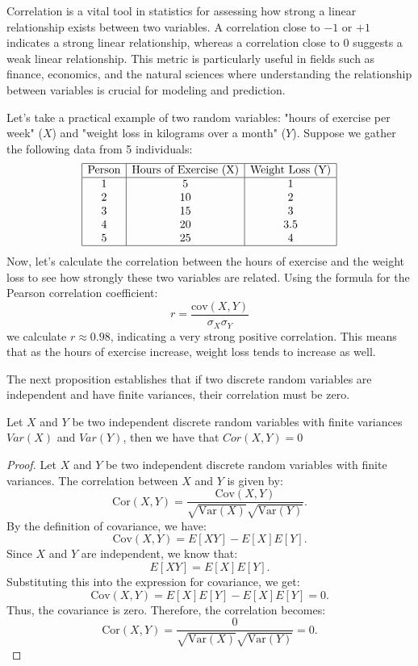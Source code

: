 Correlation is a vital tool in statistics for assessing how strong a linear relationship exists between two variables. A correlation close to \(-1\) or \(+1\) indicates a strong linear relationship, whereas a correlation close to \(0\) suggests a weak linear relationship. This metric is particularly useful in fields such as finance, economics, and the natural sciences where understanding the relationship between variables is crucial for modeling and prediction.

\begin{example}
Let's take a practical example of two random variables: "hours of exercise per week" (\(X\)) and "weight loss in kilograms over a month" (\(Y\)). Suppose we gather the following data from 5 individuals:
\[
\begin{array}{|c|c|c|}
\hline
\text{Person} & \text{Hours of Exercise (X)} & \text{Weight Loss (Y)} \\
\hline
1 & 5 & 1 \\
2 & 10 & 2 \\
3 & 15 & 3 \\
4 & 20 & 3.5 \\
5 & 25 & 4 \\
\hline
\end{array}
\]
Now, let's calculate the correlation between the hours of exercise and the weight loss to see how strongly these two variables are related. Using the formula for the Pearson correlation coefficient:
\[
r = \frac{\text{cov}(X, Y)}{\sigma_X \sigma_Y}
\]
we calculate \( r \approx 0.98 \), indicating a very strong positive correlation. This means that as the hours of exercise increase, weight loss tends to increase as well.
\end{example}

The next proposition establishes that if two discrete random variables are independent and have finite variances, their correlation must be zero.

\begin{proposition}
Let $X$ and $Y$ be two independent discrete random variables with finite variances $Var(X)$ and $Var(Y)$, then we have that $Cor\left(X,Y\right)=0$
\end{proposition}
\begin{proof}
Let \( X \) and \( Y \) be two independent discrete random variables with finite variances. The correlation between \( X \) and \( Y \) is given by:
\[
\text{Cor}(X, Y) = \frac{\text{Cov}(X, Y)}{\sqrt{\text{Var}(X)} \sqrt{\text{Var}(Y)}}.
\]
By the definition of covariance, we have:
\[
\text{Cov}(X, Y) = E[XY] - E[X]E[Y].
\]
Since \( X \) and \( Y \) are independent, we know that:
\[
E[XY] = E[X] E[Y].
\]
Substituting this into the expression for covariance, we get:
\[
\text{Cov}(X, Y) = E[X] E[Y] - E[X] E[Y] = 0.
\]
Thus, the covariance is zero. Therefore, the correlation becomes:
\[
\text{Cor}(X, Y) = \frac{0}{\sqrt{\text{Var}(X)} \sqrt{\text{Var}(Y)}} = 0.
\]
\end{proof}


